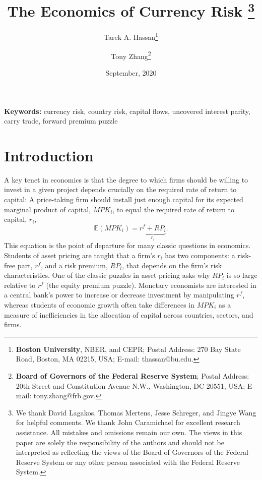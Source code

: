 \documentclass[11pt]{article}
\begin{document}
\title{The Economics of Currency Risk \thanks{We thank David Lagakos, Thomas Mertens, Jesse Schreger, and Jingye Wang for helpful comments. We thank John Caramichael for excellent research assistance. All mistakes and omissions remain our own. The views in this paper are solely the responsibility of the authors and should not be interpreted as reflecting the views of the Board of Governors of the Federal Reserve System or any other person associated with the Federal Reserve System.}}

\author{Tarek A. Hassan\thanks{\textbf{Boston University}, NBER, and CEPR; Postal Address: 270 Bay State Road, Boston, MA 02215, USA; E-mail: thassan@bu.edu.} \and Tony Zhang\thanks{\textbf{Board of Governors of the Federal Reserve System}; Postal Address: 20th Street and Constitution Avenue N.W., Washington, DC 20551, USA; E-mail: tony.zhang@frb.gov.}}     


\date{September, 2020}

\maketitle

\vspace{0.5in}



\vspace{2in}


{\noindent \textbf{Keywords:} currency risk, country risk, capital flows, uncovered interest parity, carry trade, forward premium puzzle}

\pagebreak

 \setcounter{page}{1}


\section{Introduction}


A key tenet in economics is that the degree to which firms should be willing to invest in a given project depends crucially on the required rate of return to capital: A price-taking firm should install just enough capital for its expected marginal product of capital, $MPK_i$, to equal the required rate of return to capital, $r_i$,
\begin{equation}
  \mathbb{E}\left(MPK_i\right)=\underbrace{r^f+RP_i}_{r_i}.
  \label{eq_one}
\end{equation} 
This equation is the point of departure for many classic questions in economics. Students of asset pricing are taught that a firm's $r_i$ has two components: a risk-free part, $r^f$, and a risk premium, $RP_i$, that depends on the firm's risk characteristics. One of the classic puzzles in asset pricing asks why $RP_i$ is so large relative to $r^f$ (the equity premium puzzle). Monetary economists are interested in a central bank's power to increase or decrease investment by manipulating $r^f$, whereas students of economic growth often take differences in $MPK_i$ as a measure of inefficiencies in the allocation of capital across countries, sectors, and firms.
\end{document}
